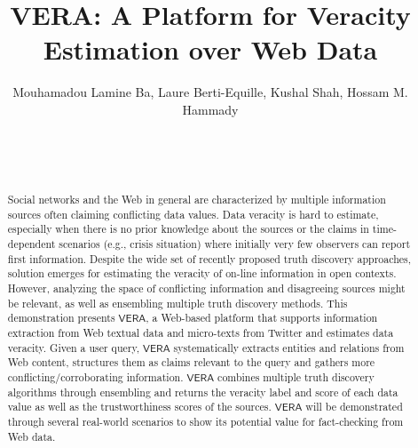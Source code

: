 \documentclass{sig-alternate-2013}
\newcommand{\VERA}{\ensuremath{\mathsf{VERA}}}
\begin{document}
\title{VERA: A Platform for Veracity Estimation over Web Data}



\author{
\alignauthor
Mouhamadou Lamine Ba, Laure Berti-Equille, Kushal Shah, Hossam M. Hammady\\
       \\
       \\
       \\
}

\maketitle



\begin{sloppypar}
{
\begin{abstract}
Social networks and the Web in general are characterized by multiple information sources often claiming conflicting data values.
Data veracity is hard to estimate, especially when there is no prior knowledge about the sources or the claims in 
time-dependent scenarios (e.g., crisis situation) where initially very few observers can report first information. Despite the wide set of recently proposed truth
discovery approaches,  solution emerges for estimating the veracity of on-line information in open contexts.
However, analyzing the space of conflicting information and disagreeing sources might be relevant, as well as ensembling multiple
truth discovery methods. This demonstration presents $\VERA$, a Web-based platform that supports information extraction from Web textual data 
and micro-texts from Twitter and estimates data veracity. Given a user query, $\VERA$  systematically extracts entities and relations from Web content, structures them as claims relevant to the query and gathers more conflicting/corroborating information. $\VERA$ combines multiple truth discovery algorithms through ensembling  and  returns the  veracity label and score of each data value  as well as the trustworthiness scores of the sources. $\VERA$ will be demonstrated through several real-world scenarios to show its potential
value for fact-checking from Web data.
\end{abstract}















}
\end{sloppypar}
\end{document}
